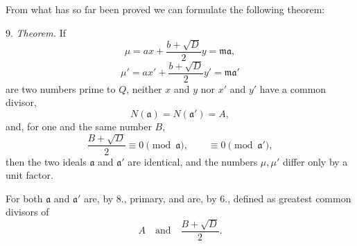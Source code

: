 \documentclass[11pt]{article}
\begin{document}
From what has so far been proved we can formulate the following theorem:

9. \emph{Theorem.} If
\[
 \mu=ax+\frac{b+\sqrt D}{2}y=\mathfrak m\mathfrak a,
\]
\[
 \mu'=ax'+\frac{b+\sqrt D}{2}y'=\mathfrak m\mathfrak a'
\]
are two numbers prime to $Q$, neither $x$ and $y$ nor $x'$ and $y'$ have a common divisor,
\[
 N(\mathfrak a)=N(\mathfrak a')=A,
\]
and, for one and the same number $B$,
\[
 \frac{B+\sqrt D}{2}\equiv0\pmod{\mathfrak a},
 \qquad
 \equiv0\pmod{\mathfrak a'},
\]
then the two ideals $\mathfrak a$ and $\mathfrak a'$ are identical, and the numbers $\mu,\mu'$ differ only by a unit factor.

For both $\mathfrak a$ and $\mathfrak a'$ are, by 8., primary, and are, by 6., defined as greatest common divisors of
\[
 A\quad\text{and}\quad \frac{B+\sqrt D}{2}.
\]
\end{document}
